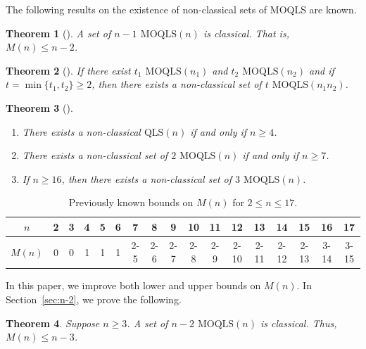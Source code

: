 \documentclass[a4paper]{article}
\newtheorem{theorem}{Theorem}
\theoremstyle{definition}
\newcommand{\QLS}[1]{\(\mathrm{QLS}(#1)\)}
\newcommand{\MOLS}[1]{\(\mathrm{MOLS}(#1)\)}
\newcommand{\MOQLS}[1]{\(\mathrm{MOQLS}(#1)\)}
\begin{document}
The following results on the existence of non-classical sets of MOQLS are known.

\begin{theorem}[\cite{36paper}]
    A set of \(n-1\) \MOQLS{n} is classical. That is, \(M(n)\leq n-2\).
\end{theorem}

\begin{theorem}[\cite{GMOQLS}]
    If there exist \(t_1\) \MOQLS{n_1} and \(t_2\) \MOQLS{n_2} and if \(t=\min\{t_1,t_2\}\geq2\), then there exists a non-classical set of \(t\) \MOQLS{n_1n_2}.
\end{theorem}

\begin{theorem}[\cite{36paper,nonclassical,2MOQLS7,GMOQLS}]
    \begin{enumerate}
        \item There exists a non-classical \QLS{n} if and only if \(n\geq4\).
        \item There exists a non-classical set of \(2\) \MOQLS{n} if and only if \(n\geq7\).
        \item If \(n\geq16\), then there exists a non-classical set of \(3\) \MOQLS{n}.
    \end{enumerate}
\end{theorem}

\begin{table}[H]
    \centering
    \begin{tabular}{c|cccccccccccccccc}
\(n\) & 2 & 3 & 4 & 5 & 6 & 7 & 8 & 9 & 10 & 11 & 12 & 13 & 14 & 15 & 16 & 17\\
\hline
\(M(n)\) & 0 & 0 & 1 & 1 & 1 & 2-5 & 2-6 & 2-7 & 2-8 & 2-9 & 2-10 & 2-11 & 2-12 & 2-13 & 3-14 & 3-15
\end{tabular}
\caption{Previously known bounds on \(M(n)\) for \(2\leq n\leq17\).}
    \label{tab:oldbounds}
\end{table}

In this paper, we improve both lower and upper bounds on \(M(n)\). In Section~\ref{sec:n-2}, we prove the following.


\begin{theorem}\label{thm:n-2}
    Suppose \(n\geq3\). A set of \(n-2\) \MOQLS{n} is classical. Thus, \(M(n)\leq n-3\).
\end{theorem}
\end{document}
